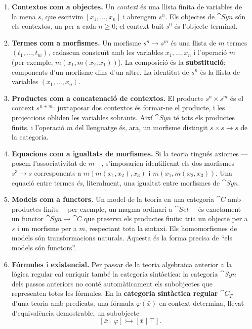 \begin{enumerate}
  \item \textbf{Contextos com a objectes.} Un \emph{context} és una llista finita de variables de la mena $s$, que escrivim $[x_1,\dots,x_n]$ i abreugem $s^n$. Els objectes de $\cat{Syn}$ són els contextos, un per a cada $n\geq 0$; el context buit $s^0$ és l'objecte terminal.
  \item \textbf{Termes com a morfismes.} Un morfisme $s^n\to s^m$ és una llista de $m$ termes $(t_1,\dots,t_m)$, cadascun construït amb les variables $x_1,\dots,x_n$ i l'operació $m$ (per exemple, $m(x_1,m(x_2,x_1))$). La composició és la \textbf{substitució}: components d'un morfisme dins d'un altre. La identitat de $s^n$ és la llista de variables $(x_1,\dots,x_n)$.
  \item \textbf{Productes com a concatenació de contextos.} El producte $s^n\times s^m$ és el context $s^{n+m}$: juxtaposar dos contextos és formar-ne el producte, i les projeccions obliden les variables sobrants. Així $\cat{Syn}$ té tots els productes finits, i l'operació $m$ del llenguatge és, ara, un morfisme distingit $s\times s\to s$ de la categoria.
  \item \textbf{Equacions com a igualtats de morfismes.} Si la teoria tingués axiomes ---posem l'associativitat de $m$---, s'imposarien identificant els dos morfismes $s^3\to s$ corresponents a $m(m(x_1,x_2),x_3)$ i $m(x_1,m(x_2,x_3))$. Una equació entre termes \emph{és}, literalment, una igualtat entre morfismes de $\cat{Syn}$.
  \item \textbf{Models com a functors.} Un model de la teoria en una categoria $\cat{C}$ amb productes finits ---per exemple, un magma ordinari a $\cat{Set}$--- és exactament un functor $\cat{Syn}\to\cat{C}$ que preserva els productes finits: tria un objecte per a $s$ i un morfisme per a $m$, respectant tota la sintaxi. Els homomorfismes de models són transformacions naturals. Aquesta és la forma precisa de \enquote{els models són functors}.
  \item \textbf{Fórmules i existencial.} Per passar de la teoria algebraica anterior a la lògica regular cal enriquir també la categoria sintàctica: la categoria $\cat{Syn}$ dels passos anteriors no conté automàticament els subobjectes que representen totes les fórmules. En la \textbf{categoria sintàctica regular} $\cat{C}_T$ d'una teoria amb predicats, una fórmula $\varphi(\bar x)$ en context determina, llevat d'equivalència demostrable, un subobjecte
  \[
  [\bar x\mid\varphi]\rightarrowtail[\bar x\mid\top].
  \]

\end{enumerate}
